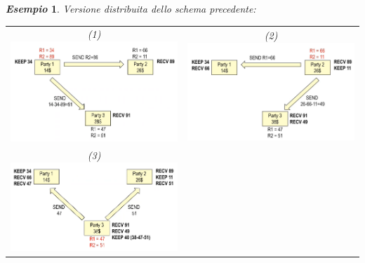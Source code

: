 \documentclass{book}
\newtheorem{esempio}{\emph{Esempio}}
\begin{document}
\begin{esempio}
	Versione distribuita dello schema precedente:\newline
	\begin{tabular}{c c}
		(1)\includegraphics[scale=0.5]{2021-12-29-23-40-26.png}%
		 &
		(2)\includegraphics[scale=0.5]{2021-12-29-23-43-20.png}%
		\\
		(3)\includegraphics[scale=0.5]{2021-12-29-23-45-01.png}%

\end{tabular}
\end{esempio}
\end{document}
